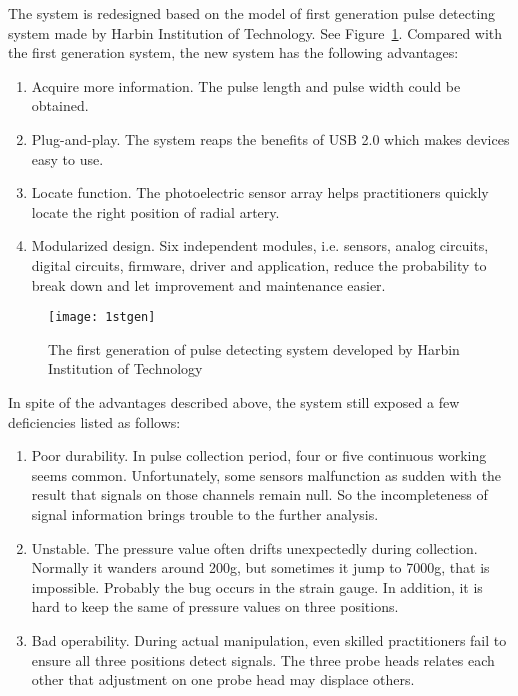 The system is redesigned based on the model of first generation pulse
detecting system made by Harbin Institution of Technology. See
Figure~\ref{fig:1stgen}. Compared with the first generation system,
the new system has the following advantages:
\begin{enumerate}[(1)]
    \item Acquire more information. The pulse length and pulse width
        could be obtained. 
    \item Plug-and-play. The system reaps the benefits of USB 2.0
        which makes devices easy to use.
    \item Locate function. The photoelectric sensor array helps
        practitioners quickly locate the right position of radial artery. 
    \item Modularized design. Six independent modules, i.e. sensors, analog
        circuits, digital circuits, firmware, driver and application,
        reduce the probability to break down and let improvement and
        maintenance easier.
\end{enumerate}
\begin{figure}[htpb]
    \begin{center}
        \texttt{[image: 1stgen]}
    \end{center}
    \caption{The first generation of pulse detecting system developed
    by Harbin Institution of Technology}
    \label{fig:1stgen}
\end{figure}

In spite of the advantages described above, the system still exposed
a few deficiencies listed as follows: 
\begin{enumerate}[(1)]
    \item Poor durability. In pulse collection period, four or five
        continuous working seems common. Unfortunately, some sensors
        malfunction as sudden with the result that signals on those channels
        remain null. So the incompleteness of signal information brings
        trouble to the further analysis. 
    \item Unstable. The pressure value often drifts unexpectedly
        during collection. Normally it wanders around 200g, but
        sometimes it jump to 7000g, that is impossible. Probably the
        bug occurs in the strain gauge. In addition, it is hard to
        keep the same of pressure values on three positions. 
    \item Bad operability. During actual manipulation, even skilled
        practitioners fail to ensure all three positions detect
        signals. The three probe heads relates each other that
        adjustment on one probe head may displace others. 
\end{enumerate}

